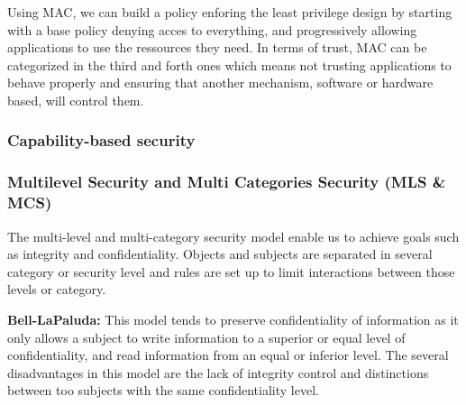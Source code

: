 \documentclass[pdftex,a4paper,titlepage,11pt]{article}
\begin{document}
\bigskip

Using MAC, we can build a policy enforing the least privilege design by
starting with a base policy denying acces to everything, and progressively
allowing applications to use the ressources they need. In terms of trust, MAC
can be categorized in the third and forth ones which means not trusting
applications to behave properly and ensuring that another mechanism, software or
hardware based, will control them.

\subsubsection{Capability-based security}


\subsubsection{Multilevel Security and Multi Categories Security (MLS \& MCS)}

The multi-level and multi-category security model enable us to achieve goals
such as integrity and confidentiality. Objects and subjects are separated in
several category or security level and rules are set up to limit interactions
between those levels or category.

\bigskip

\textbf{Bell-LaPaluda:} This model \cite{BLP} tends to preserve confidentiality
of
information as it only allows a subject to write information to a superior or
equal level of confidentiality, and read information from an equal or inferior
level. The several disadvantages in this model are the lack of integrity control
and distinctions between too subjects with the same confidentiality level.
\end{document}
